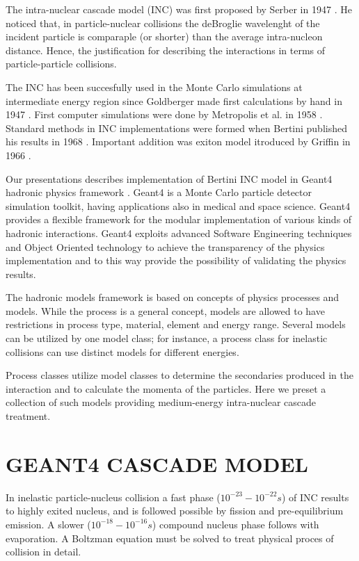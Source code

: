 \documentclass[twocolumn,twoside,slac]{revtex4}
\begin{document}
The intra-nuclear cascade model (INC) was first proposed by Serber in 1947 \cite{serber47}.  
He noticed that, in particle-nuclear collisions the deBroglie wavelenght of the incident particle is 
comparaple (or shorter) than the average intra-nucleon distance.
Hence, the justification for describing the interactions in terms of particle-particle  collisions.

The INC has been succesfully used in the Monte Carlo simulations at intermediate energy region 
since Goldberger made first calculations by hand in 1947 \cite{goldberger48}. 
First computer simulations were done by Metropolis et al. in 1958 \cite{metropolis58}. 
Standard methods in INC implementations were formed when Bertini published his results in 1968 \cite{bertini68}.
Important addition was exiton model itroduced by Griffin in 1966 \cite{griffin66}. 

Our presentations describes implementation of Bertini INC model in Geant4 hadronic physics framework \cite{geant4collaboration03}.
Geant4 is a Monte Carlo particle detector simulation toolkit, having applications also in  medical and space
science. 
Geant4 provides a flexible framework for the modular implementation of
various kinds of hadronic interactions. 
Geant4 exploits advanced Software Engineering techniques and Object
Oriented technology to achieve the transparency of the physics
implementation and to this way provide the possibility of validating the
physics results. 

The hadronic models framework is based on concepts of physics
processes and models. While the process is a general concept, models
are allowed to have restrictions in process type, material, element
and energy range.  Several models can be utilized by one model class; for instance, a
process class for inelastic collisions can use distinct models for different energies.


Process classes utilize model classes to determine the
secondaries produced in the interaction and to calculate the momenta
of the particles. Here we preset a collection of such models providing medium-energy
intra-nuclear cascade treatment.


\section{GEANT4 CASCADE MODEL}

In inelastic particle-nucleus collision a fast phase ($10^{-23} - 10^{-22} s$) of INC results to highly exited nucleus, 
and is followed possible by fission and pre-equilibrium emission. 
A slower ($10^{-18} - 10^{-16} s$) compound nucleus phase follows with evaporation.
A Boltzman equation must be solved to treat physical proces of collision in detail.
 
\end{document}
